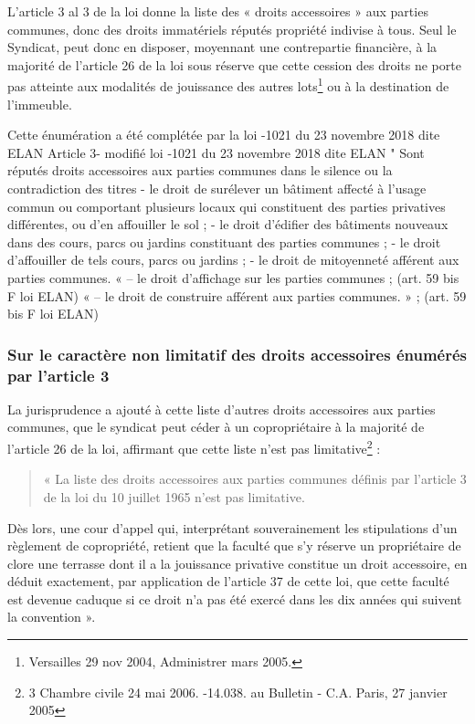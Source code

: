 			L'article 3 al 3 de la loi donne la liste des « droits accessoires » aux parties communes, donc des droits
			immatériels réputés propriété indivise à tous. Seul le Syndicat, peut donc en disposer, moyennant une
			contrepartie financière, à la majorité de l’article 26 de la loi sous réserve que cette cession des droits ne
			porte pas atteinte aux modalités de jouissance des autres lots\footnote{Versailles 29 nov 2004, Administrer  mars 2005.} ou à la destination de l’immeuble.
			
			Cette énumération a été complétée par la loi -1021 du 23 novembre 2018 dite ELAN
			Article 3- modifié loi -1021 du 23 novembre 2018 dite ELAN
			" Sont réputés droits accessoires aux parties communes dans le silence ou la contradiction des titres
			- le droit de surélever un bâtiment affecté à l'usage commun ou comportant plusieurs locaux qui
			constituent des parties privatives différentes, ou d'en affouiller le sol ;
			- le droit d'édifier des bâtiments nouveaux dans des cours, parcs ou jardins constituant des parties
			communes ;
			- le droit d'affouiller de tels cours, parcs ou jardins ;
			- le droit de mitoyenneté afférent aux parties communes.
			« – le droit d’affichage sur les parties communes ; (art. 59 bis F loi ELAN)
			« – le droit de construire afférent aux parties communes. » ; (art. 59 bis F loi ELAN)
		
		\subsubsection{Sur le caractère non limitatif des droits accessoires énumérés par l’article 3}
		
			La jurisprudence a ajouté à cette liste d’autres droits accessoires aux parties communes, que le syndicat
			peut céder à un copropriétaire à la majorité de l’article 26 de la loi, affirmant que cette liste n’est pas
			limitative\footnote{3\degre{} Chambre civile 24 mai 2006. -14.038. au Bulletin - C.A. Paris, 27 janvier 2005} :
			\begin{quote}
				« La liste des droits accessoires aux parties communes définis par l'article 3 de la loi du 10 juillet 1965 n'est
			pas limitative.
			\end{quote}
		
			Dès lors, une cour d'appel qui, interprétant souverainement les stipulations d'un règlement de copropriété,
			retient que la faculté que s'y réserve un propriétaire de clore une terrasse dont il a la jouissance privative
			constitue un droit accessoire, en déduit exactement, par application de l'article 37 de cette loi, que cette
			faculté est devenue caduque si ce droit n'a pas été exercé dans les dix années qui suivent la convention ».
			
